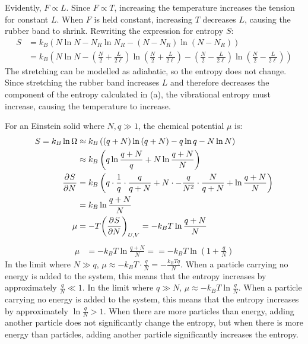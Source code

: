 \documentclass{article}
\begin{document}
Evidently, $F \propto L$.
Since $F \propto T$, increasing the temperature increases the tension for constant $L$. When $F$ is held constant, increasing $T$ decreases $L$, causing the rubber band to shrink.
Rewriting the expression for entropy $S$:
\begin{equation}
    \begin{split}
        S & = k_B\left(N\ln N - N_R\ln N_R - \left(N - N_R\right)\ln\left(N - N_R\right)\right) \\
        & = k_B\left(N\ln N - \left(\frac{N}{2} + \frac{L}{2\ell}\right)\ln\left(\frac{N}{2} + \frac{L}{2\ell}\right) - \left(\frac{N}{2} - \frac{L}{2\ell}\right)\ln\left(\frac{N}{2} - \frac{L}{2\ell}\right)\right)
    \end{split}
\end{equation}
The stretching can be modelled as adiabatic, so the entropy does not change. Since stretching the rubber band increases $L$ and therefore decreases the component of the entropy calculated in (a), the vibrational entropy must increase, causing the temperature to increase.

\clearpage

For an Einstein solid where $N, q \gg 1$, the chemical potential $\mu$ is:
\begin{equation}
    \begin{split}
        S = k_B\ln\Omega & \approx k_B\left(\left(q + N\right)\ln\left(q + N\right) - q\ln q - N\ln N\right) \\
        & \approx k_B\left(q\ln\frac{q + N}{q} + N\ln\frac{q + N}{N}\right) \\
        \frac{\partial^{}S} {\partial N^{}} & = k_B\left(q \cdot \frac{1}{q} \cdot \frac{q}{q + N} + N \cdot -\frac{q}{N^2} \cdot \frac{N}{q + N} + \ln\frac{q + N}{N}\right) \\
        & = k_B\ln\frac{q + N}{N} \\
        \mu & = -T{\left(\frac{\partial^{}S} {\partial N^{}}\right)}_{U,V} = -k_B T\ln\frac{q + N}{N}
    \end{split}
\end{equation}
\begin{equation}
    \begin{split}
        \mu & = -k_B T\ln\frac{q + N}{N} = = -k_B T\ln(1 + \frac{q}{N})
    \end{split}
\end{equation}
In the limit where $N \gg q$, $\mu \approx -k_B T \cdot \frac{q}{N} = -\frac{k_B Tq}{N}$. When a particle carrying no energy is added to the system, this means that the entropy increases by approximately $\frac{q}{N} \ll 1$. In the limit where $q \gg N$, $\mu \approx -k_B T\ln\frac{q}{N}$. When a particle carrying no energy is added to the system, this means that the entropy increases by approximately $\ln\frac{q}{N} > 1$. When there are more particles than energy, adding another particle does not significantly change the entropy, but when there is more energy than particles, adding another particle significantly increases the entropy.
\end{document}
